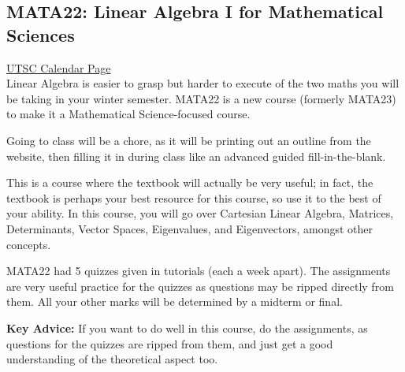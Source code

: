 \documentclass[11pt]{article}
\begin{document}
\subsection{MATA22: Linear Algebra I for Mathematical Sciences}

\href{https://utsc.calendar.utoronto.ca/course/MATA22H3}{UTSC Calendar Page}\\

Linear Algebra is easier to grasp but harder to execute of the two maths you will be taking in your winter semester. MATA22 is a new course (formerly MATA23) to make it a Mathematical Science-focused course.\par
Going to class will be a chore, as it will be printing out an outline from the website, then filling it in during class like an advanced guided fill-in-the-blank.\par
This is a course where the textbook will actually be very useful; in fact, the textbook is perhaps your best resource for this course, so use it to the best of your ability. In this course, you will go over Cartesian Linear Algebra, Matrices, Determinants, Vector Spaces, Eigenvalues, and Eigenvectors, amongst other concepts. \par
MATA22 had 5 quizzes given in tutorials (each a week apart). The assignments are very useful practice for the quizzes as questions may be ripped directly from them. All your other marks will be determined by a midterm or final.\par
\textbf{Key Advice:} If you want to do well in this course, do the assignments, as questions for the quizzes are ripped from them, and just get a good understanding of the theoretical aspect too.
\end{document}
